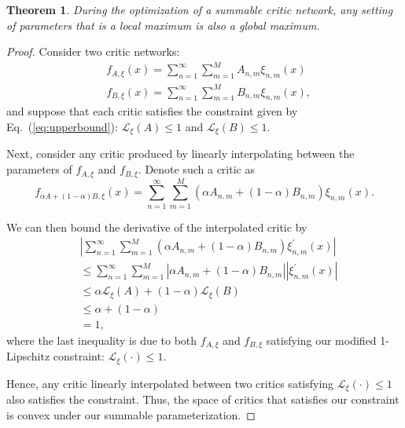 \documentclass[letterpaper]{article} %
\newtheorem{theorem}{Theorem}
\begin{document}
\begin{theorem} \label{thm:global_max}
\normalfont
During the optimization of a summable critic network, any setting of parameters that is a local maximum is also a global maximum.
\end{theorem}

\begin{proof}
\normalfont
Consider two critic networks:
\begin{equation*}
\begin{aligned}
&f_{A, \xi}(x) = \sum_{n=1}^\infty \sum_{m=1}^M A_{n,m}\xi_{n,m}(x) \\
&f_{B, \xi}(x) = \sum_{n=1}^\infty \sum_{m=1}^M B_{n,m}\xi_{n,m}(x),
\end{aligned}
\end{equation*}
and suppose that each critic satisfies the constraint given by Eq.~(\ref{eq:upperbound}): $\mathcal{L}_\xi(A) \leq 1$ and $\mathcal{L}_\xi(B) \leq 1$.

Next, consider any critic produced by linearly interpolating between the parameters of $f_{A, \xi}$ and $f_{B, \xi}$. Denote such a critic as
\begin{equation*}
f_{\alpha A + (1 - \alpha) B, \xi}(x) = \sum_{n=1}^\infty \sum_{m=1}^M \left(\alpha A_{n,m} + (1 - \alpha) B_{n,m}\right)\xi_{n,m}(x).
\end{equation*}

We can then bound the derivative of the interpolated critic by
\begin{equation*}
\begin{aligned}
&\left|\sum_{n=1}^\infty \sum_{m=1}^M \left(\alpha A_{n,m} + (1 - \alpha) B_{n,m}\right)\xi^\prime_{n,m}(x) \right| \\
&\leq \sum_{n=1}^\infty \sum_{m=1}^M \left|\alpha A_{n,m} + (1 - \alpha) B_{n,m}\right| \left|\xi^\prime_{n,m}(x)\right| \\
&\leq \alpha \mathcal{L}_\xi(A) + (1 - \alpha) \mathcal{L}_\xi(B) \\
&\leq \alpha + (1-\alpha) \\
&= 1,
\end{aligned}
\end{equation*}
where the last inequality is due to both $f_{A, \xi}$ and $f_{B, \xi}$ satisfying our modified 1-Lipschitz constraint: $\mathcal{L}_\xi(\cdot) \leq 1$.

Hence, any critic linearly interpolated between two critics satisfying $\mathcal{L}_\xi(\cdot) \leq 1$ also satisfies the constraint. Thus, the space of critics that satisfies our constraint is convex under our summable parameterization.


\end{proof}
\end{document}
